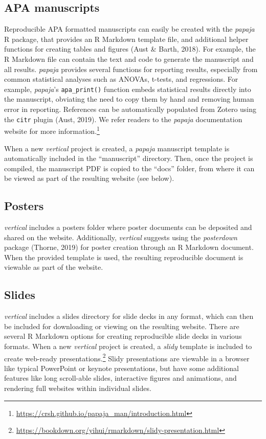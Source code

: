 \documentclass[
  english,
  jou,floatsintext]{apa6}
\begin{document}
\hypertarget{apa-manuscripts}{%
\subsection{APA manuscripts}\label{apa-manuscripts}}

Reproducible APA formatted manuscripts can easily be created with the \emph{papaja} R package, that provides an R Markdown template file, and additional helper functions for creating tables and figures (Aust \& Barth, 2018). For example, the R Markdown file can contain the text and code to generate the manuscript and all results. \emph{papaja} provides several functions for reporting results, especially from common statistical analyses such as ANOVAs, t-tests, and regressions. For example, \emph{papaja}'s \texttt{apa\_print()} function embeds statistical results directly into the manuscript, obviating the need to copy them by hand and removing human error in reporting. References can be automatically populated from Zotero using the \texttt{citr} plugin (Aust, 2019). We refer readers to the \emph{papaja} documentation website for more information.\footnote{\url{https://crsh.github.io/papaja_man/introduction.html}}

When a new \emph{vertical} project is created, a \emph{papaja} manuscript template is automatically included in the ``manuscript'' directory. Then, once the project is compiled, the manuscript PDF is copied to the ``docs'' folder, from where it can be viewed as part of the resulting website (see below).

\hypertarget{posters}{%
\subsection{Posters}\label{posters}}

\emph{vertical} includes a posters folder where poster documents can be deposited and shared on the website. Additionally, \emph{vertical} suggests using the \emph{posterdown} package (Thorne, 2019) for poster creation through an R Markdown document. When the provided template is used, the resulting reproducible document is viewable as part of the website.

\hypertarget{slides}{%
\subsection{Slides}\label{slides}}

\emph{vertical} includes a slides directory for slide decks in any format, which can then be included for downloading or viewing on the resulting website. There are several R Markdown options for creating reproducible slide decks in various formats. When a new \emph{vertical} project is created, a \emph{slidy} template is included to create web-ready presentations.\footnote{\url{https://bookdown.org/yihui/rmarkdown/slidy-presentation.html}} Slidy presentations are viewable in a browser like typical PowerPoint or keynote presentations, but have some additional features like long scroll-able slides, interactive figures and animations, and rendering full websites within individual slides.
\end{document}
